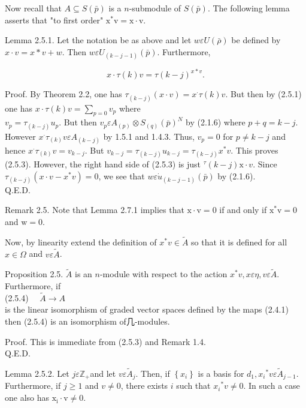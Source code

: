 \documentclass[10pt]{article}
\begin{document}
Now recall that $A \subseteq S(\bar{p})$ is a $n$-submodule of $S(\bar{p})$. The following lemma asserts that "to first order" $\mathrm{x}{ }^{*} \mathrm{v}=\mathrm{x} \cdot \mathrm{v}$.

Lemma 2.5.1. Let the notation be as above and let $w \varepsilon U(\bar{\rho})$ be defined by $x \cdot v=x * v+w$. Then $w \varepsilon U_{(k-j-1)}(\bar{p})$. Furthermore,


\begin{equation*}
x \cdot \tau(k) v=\tau(k-j)^{x * v} . \tag{2.5.3}
\end{equation*}


Proof. By Theorem 2.2, one has $\tau_{(k-j)}(x \cdot v)=x^{\cdot} \tau(k) v$. But then by (2.5.1) one has $x \cdot \tau(k) v=\sum_{p=0} v_{p}$ where\\
$v_{p}=\tau_{(k-j)} u_{p}$. But then $v_{p} \varepsilon A_{(p)} \otimes S_{(q)}(\bar{p})^{N}$ by (2.1.6) where $p+q=k-j$. However $x^{\cdot} \tau_{(k)} v \varepsilon A_{(k-j)}$ by 1.5.1 and 1.4.3. Thus, $v_{p}=0$ for $p \neq k-j$ and hence $x^{\cdot} \tau_{(k)} v=v_{k-j}$. But $v_{k-j}=\tau_{(k-j)} u_{k-j}=\tau_{(k-j)} x^{*} v$. This proves (2.5.3). However, the right hand side of (2.5.3) is just ${ }^{\tau}(k-j) \mathrm{x} \cdot v$. Since $\tau_{(k-j)}\left(x \cdot v-x^{*} v\right)=0$, we see that $w \varepsilon \dot{u}_{(k-j-1)}(\bar{p})$ by (2.1.6).\\
Q.E.D.

Remark 2.5. Note that Lemma 2.7.1 implies that $\mathrm{x} \cdot \mathrm{v}=0$ if and only if $\mathrm{x}^{*} \mathrm{v}=0$ and $\mathrm{w}=0$.

Now, by linearity extend the definition of $x^{*} v \in \tilde{A}$ so that it is defined for all $x \in \Omega$ and $v \varepsilon \tilde{A}$.

Proposition 2.5. $\tilde{A}$ is an $n$-module with respect to the action $x^{*} v, x \varepsilon \eta, v \varepsilon \tilde{A}$. Furthermore, if\\
(2.5.4) $\quad \tilde{A} \rightarrow A$\\
is the linear isomorphism of graded vector spaces defined by the maps (2.4.1) then (2.5.4) is an isomorphism of几-modules.

Proof. This is immediate from (2.5.3) and Remark 1.4.\\
Q.E.D.

Lemma 2.5.2. Let $j \varepsilon \mathbb{Z}_{+}$and let $v \varepsilon \tilde{A}_{j}$. Then, if $\left\{x_{i}\right\}$ is a basis for $d_{1}, x_{i}{ }^{*} v \varepsilon \tilde{A}_{j-1}$. Furthermore, if $j \geq 1$ and $v \neq 0$, there exists $i$ such that $x_{i}{ }^{*} v \neq 0$. In such a case one also has $\mathrm{x}_{\mathrm{i}} \cdot \mathrm{v} \neq 0$.
\end{document}

